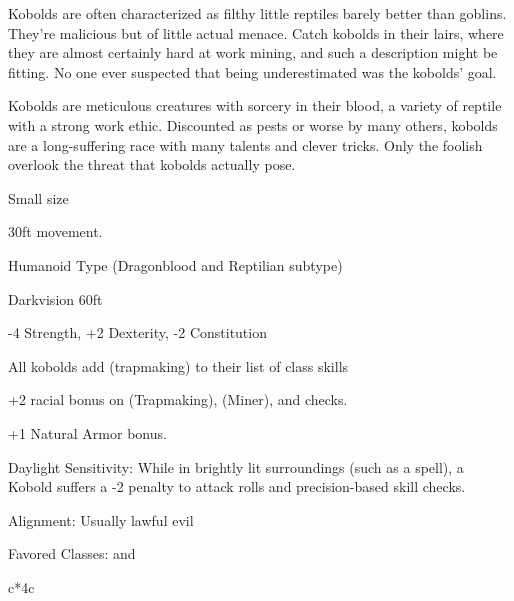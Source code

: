 
Kobolds are often characterized as filthy little reptiles barely better than goblins. They’re malicious but of little actual menace. Catch kobolds in their lairs, where they are almost certainly hard at work mining, and such a description might be fitting. No one ever suspected that being underestimated was the kobolds’ goal.

Kobolds are meticulous creatures with sorcery in their blood, a variety of reptile with a strong work ethic. Discounted as pests or worse by many others, kobolds are a long-suffering race with many talents and clever tricks. Only the foolish overlook the threat that kobolds actually pose.

\begin{multicols}{2}

\begin{itemize*}
\item Small size
\item 30ft movement.
\item Humanoid Type (Dragonblood and Reptilian subtype)
\item Darkvision 60ft
\item -4 Strength, +2 Dexterity, -2 Constitution
\item All kobolds add  (trapmaking) to their list of class skills
\item +2 racial bonus on  (Trapmaking),  (Miner), and  checks.
\item +1 Natural Armor bonus.
\item Daylight Sensitivity: While in brightly lit surroundings (such as a  spell), a Kobold suffers a -2 penalty to attack rolls and precision-based skill checks.
\item Alignment: Usually lawful evil
\item Favored Classes:  and 
\end{itemize*}

\begin{multicolsbasictable}{c*{4}{c}}


\end{multicolsbasictable}
\end{multicols}
